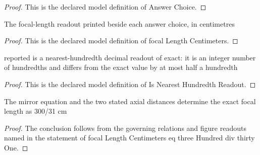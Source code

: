 \begin{proof}
  This is the declared model definition of Answer Choice.
\end{proof}
\begin{definition}
  \label{def:physics:phyx-mini-0038:phyxminiproblems-problemphyxmini0038-answerchoice-focallengthcentimeters}
  The focal-length readout printed beside each answer choice, in centimetres
\end{definition}
\begin{proof}
  This is the declared model definition of focal Length Centimeters.
\end{proof}
\begin{definition}
  \label{def:physics:phyx-mini-0038:phyxminiproblems-problemphyxmini0038-isnearesthundredthreadout}
  reported is a nearest-hundredth decimal readout of exact: it is an integer number of hundredths and differs from the exact value by at most half a hundredth
\end{definition}
\begin{proof}
  This is the declared model definition of Is Nearest Hundredth Readout.
\end{proof}
\begin{lemma}
  \label{lem:physics:phyx-mini-0038:phyxminiproblems-problemphyxmini0038-focallengthcentimeters-eq-threehundred-div-thirtyone}
  The mirror equation and the two stated axial distances determine the exact focal length as 300/31 cm
\end{lemma}
\begin{proof}
  The conclusion follows from the governing relations and figure readouts named in the statement of focal Length Centimeters eq three Hundred div thirty One.
\end{proof}

